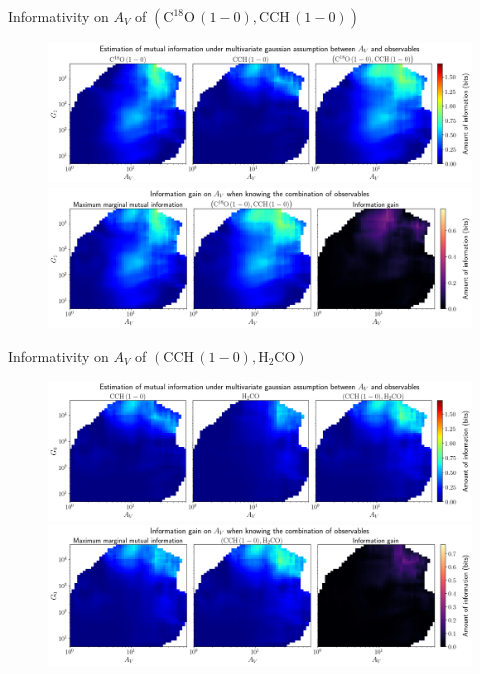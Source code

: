 \documentclass{beamer}
\begin{document}
\begin{frame}{Informativity on $A_V$ of $\left(\mathrm{C^{18}O\,(1-0)},\mathrm{CCH\,(1-0)}\right)$}
    \begin{figure}
        \centering
        \includegraphics[width=0.95\linewidth]{../linearinfogauss/av__c18o10_cch10_linearinfogauss.png}
        \vfill
        \includegraphics[width=0.95\linewidth]{../linearinfogauss/av__c18o10_cch10_linearinfogauss_gain.png}
    \end{figure}
\end{frame}

\begin{frame}{Informativity on $A_V$ of $\left(\mathrm{CCH\,(1-0)},\mathrm{H_2CO}\right)$}
    \begin{figure}
        \centering
        \includegraphics[width=0.95\linewidth]{../linearinfogauss/av__cch10_h2co_linearinfogauss.png}
        \vfill
        \includegraphics[width=0.95\linewidth]{../linearinfogauss/av__cch10_h2co_linearinfogauss_gain.png}
    \end{figure}
\end{frame}
\end{document}
